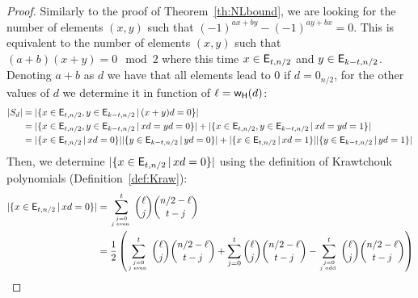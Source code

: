 \documentclass[11pt]{llncs}
\begin{document}
\begin{proof}
Similarly to the proof of Theorem~\ref{th:NLbound}, we are looking for the number of elements $(x,y)$ such that $(-1)^{a x+ by} - (-1)^{a y+ bx} =0$. This is equivalent to the number of elements $(x,y)$ such that $(a+b)(x+y)=0 \mod 2$ where this time $x \in \mathsf{E}_{t,n/2}$ and $y\in \mathsf{E}_{k-t,n/2}$. 
Denoting $a+b$ as $d$ we have that all elements lead to $0$ if $d=0_{n/2}$, for the other values of $d$ we determine it in function of $\ell=\mathsf{w_H}(d)$:
\begin{align*}
|S_d|&=|\{x\in \mathsf{E}_{t,n/2}, y \in \mathsf{E}_{k-t,n/2}\, | \, (x+y)d=0\}|\\
&=|\{x\in \mathsf{E}_{t,n/2}, y \in \mathsf{E}_{k-t,n/2}\, | \, xd=yd=0\}| +|\{x\in \mathsf{E}_{t,n/2}, y \in \mathsf{E}_{k-t,n/2}\, | \, xd=yd=1\}|
\\
&=|\{x\in \mathsf{E}_{t,n/2}\, | \, xd=0\}|   |\{y\in \mathsf{E}_{k-t,n/2}\, | \, yd=0\}| +|\{x\in \mathsf{E}_{t,n/2}\, | \, xd=1\}|   |\{y\in \mathsf{E}_{k-t,n/2}\, | \, yd=1\}|
\end{align*}
Then, we determine $|\{x\in \mathsf{E}_{t,n/2}\, | \, xd=0\}|$ using the definition of Krawtchouk polynomials (Definition~\ref{def:Kraw}): %
\begin{align*}
|\{x\in \Ekn{t}{n/2}\, | \, xd=0\}|&= \sum_{j=0 \atop j \text{ even }}^{t} \binom{\ell}{j} \binom{n/2-\ell}{t-j}\\
&= \frac{1}{2}\left( \sum_{j=0 \atop j \text{ even }}^{t} \binom{\ell}{j} \binom{n/2-\ell}{t-j} + \sum_{j=0}^{t} \binom{\ell}{j} \binom{n/2-\ell}{t-j} - \sum_{j=0 \atop j \text{ odd }}^{t} \binom{\ell}{j} \binom{n/2-\ell}{t-j} \right)\\

\end{align*}
\end{proof}
\end{document}
